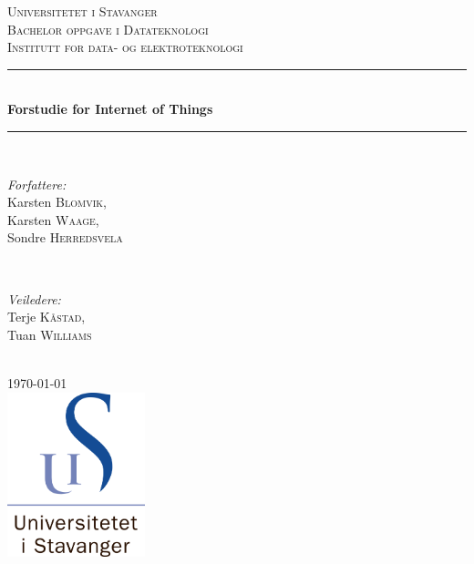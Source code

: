 \documentclass{article}
\begin{document}
%
%
%
%


\begin{titlepage}
\newcommand{\HRule}{\rule{\linewidth}{0.5mm}}
\center
\textsc{\LARGE Universitetet i Stavanger}\\[1.5cm]
\textsc{\Large Bachelor oppgave i Datateknologi}\\[0.5cm] 
\textsc{\large Institutt for data- og elektroteknologi}\\[0.5cm] 
\HRule \\[0.4cm]
{ \huge \bfseries Forstudie for Internet of Things}\\[0.4cm]
\HRule \\[1.5cm]
 

\begin{minipage}{0.4\textwidth}
\begin{flushleft} \large
\emph{Forfattere:}\\
Karsten \textsc{Blomvik},
\\ Karsten \textsc{Waage},
\\ Sondre \textsc{Herredsvela}
\end{flushleft}
\end{minipage}
~
\begin{minipage}{0.4\textwidth}
\begin{flushright} \large
\emph{Veiledere:} 
\\Terje \textsc{Kåstad}, 
\\Tuan \textsc{Williams}
\end{flushright}
\end{minipage}\\[2cm]

{\large \today}\\[2cm]

\includegraphics[width=0.3\textwidth]{uisLogo}

\vfill %

\end{titlepage}
\end{document}
